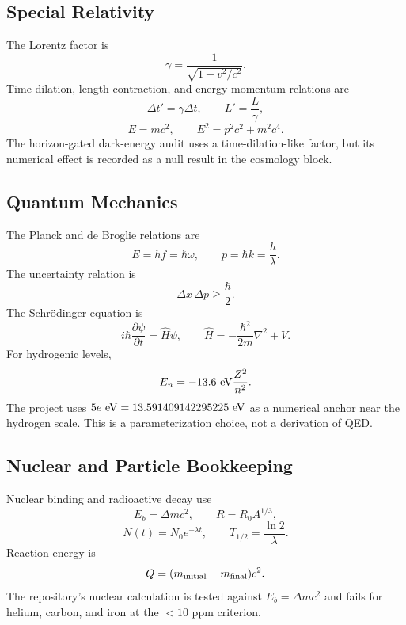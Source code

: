 \documentclass[11pt]{article}
\begin{document}
\subsection{Special Relativity}

The Lorentz factor is
\begin{equation}
    \gamma=\frac{1}{\sqrt{1-v^2/c^2}}.
\end{equation}
Time dilation, length contraction, and energy-momentum relations are
\begin{equation}
    \Delta t'=\gamma\Delta t,\qquad
    L'=\frac{L}{\gamma},
\end{equation}
\begin{equation}
    E=mc^2,\qquad
    E^2=p^2c^2+m^2c^4.
\end{equation}
The horizon-gated dark-energy audit uses a time-dilation-like factor, but its
numerical effect is recorded as a null result in the cosmology block.

\subsection{Quantum Mechanics}

The Planck and de Broglie relations are
\begin{equation}
    E=hf=\hbar\omega,\qquad
    p=\hbar k=\frac{h}{\lambda}.
\end{equation}
The uncertainty relation is
\begin{equation}
    \Delta x\,\Delta p\ge\frac{\hbar}{2}.
\end{equation}
The Schr\"odinger equation is
\begin{equation}
    i\hbar\frac{\partial\psi}{\partial t}=\hat{H}\psi,
    \qquad
    \hat{H}=-\frac{\hbar^2}{2m}\nabla^2+V.
\end{equation}
For hydrogenic levels,
\begin{equation}
    E_n=-13.6~{\rm eV}\frac{Z^2}{n^2}.
\end{equation}
The project uses $5e~{\rm eV}=13.591409142295225~{\rm eV}$ as a numerical
anchor near the hydrogen scale.  This is a parameterization choice, not a
derivation of QED.

\subsection{Nuclear and Particle Bookkeeping}

Nuclear binding and radioactive decay use
\begin{equation}
    E_b=\Delta mc^2,\qquad
    R=R_0A^{1/3},
\end{equation}
\begin{equation}
    N(t)=N_0e^{-\lambda t},\qquad
    T_{1/2}=\frac{\ln2}{\lambda}.
\end{equation}
Reaction energy is
\begin{equation}
    Q=(m_{\rm initial}-m_{\rm final})c^2.
\end{equation}
The repository's nuclear calculation is tested against $E_b=\Delta mc^2$ and
fails for helium, carbon, and iron at the $<10$ ppm criterion.
\end{document}
